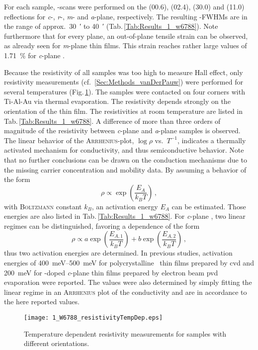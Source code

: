For each sample, \textomega-scans were performed on the (00.6), (02.4), (30.0) and (11.0) reflections for \textit{c}-, \textit{r}-, \textit{m}- and \textit{a}-plane, respectively.
The resulting \textomega-FWHMs are in the range of approx.\ \qty{30}{\arcminute} to \qty{40}{\arcminute} (Tab.\,\ref{Tab:Results_1_w6788}).
Note furthermore that for every plane, an out-of-plane tensile strain can be observed, as already seen for \textit{m}-plane thin films.
This strain reaches rather large values of \qty{1.71}{\percent} for \textit{c}-plane \cro.

Because the resistivity of all samples was too high to measure Hall effect, only resistivity measurements (cf.~\ref{Sec:Methods_vanDerPauw}) were performed for several temperatures (Fig.\,\ref{Fig:Results_1_w6788_TdH}).
The samples were contacted on four corners with Ti-Al-Au via thermal evaporation.
The resistivity depends strongly on the orientation of the thin film.
The resistivities at room temperature are listed in Tab.\,\ref{Tab:Results_1_w6788}.
A difference of more than three orders of magnitude of the resistivity between \textit{c}-plane and \textit{a}-plane samples is observed.
The linear behavior of the \textsc{Arrhenius}-plot, $\log\rho$ vs.\ $T^{-1}$, indicates a thermally activated mechanism for conductivity, and thus semiconductive behavior.
Note that no further conclusions can be drawn on the conduction mechanisms due to the missing carrier concentration and mobility data.
By assuming a behavior of the form
\begin{equation}
    \label{Equ:Results_1_Arrhenius}
    \rho\propto\exp\left(\frac{E_A}{k_BT}\right)\,,
\end{equation}
with \textsc{Boltzmann} constant $k_B$, an activation energy $E_A$ can be estimated.
Those energies are also listed in Tab.\,\ref{Tab:Results_1_w6788}.
For \textit{c}-plane \cro, two linear regimes can be distinguished, favoring a dependence of the form
\begin{equation}
    \label{Equ:Results_1_Arrhenius2}
    \rho\propto a\exp\left(\frac{E_{A,1}}{k_BT}\right)
    +b\exp\left(\frac{E_{A,2}}{k_BT}\right)\,,
\end{equation}
thus two activation energies are determined.
In previous studies, activation energies of \qtyrange{400}{500}{\milli\eV} for polycrystalline \cro\ thin films prepared by \gls{cvd}
    \cite{cheng1996}
and \qty{200}{\milli\eV} for -doped \textit{c}-plane thin films prepared by electron beam \gls{pvd} evaporation
    \cite{farrell2015}
were reported.
The values were also determined by simply fitting the linear regime in an \textsc{Arrhenius} plot of the conductivity and are in accordance to the here reported values.
\begin{figure}
    \centering
    \texttt{[image: 1\_W6788\_resistivityTempDep.eps]}
    \caption{
        Temperature dependent resistivity measurements for samples with different orientations.
    }
    \label{Fig:Results_1_w6788_TdH}
\end{figure}